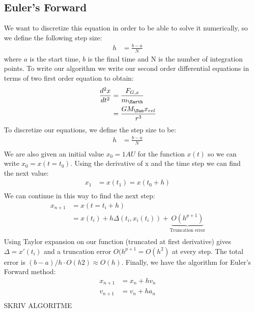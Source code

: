 \documentclass{article}
\begin{document}
\subsection*{Euler's Forward}
We want to discretize this equation in order to be able to solve it numerically, so we define the following step size:
\begin{align*}
  h &= \frac{b-a}{N}
\end{align*}
where $a$ is the start time, $b$ is the final time and N is the number of integration points.
To write our algorithm we write our second order differential equations in terms of two first order equation to obtain:
\begin{align*}
  \frac{d^2x}{dt^2} &= \frac{F_{G,x}}{m_{\Earth}}\\
  &= \frac{GM_{\Sun}x_{rel}}{r^3}\\
\end{align*}
To discretize our equations, we define the step size to be:
\begin{align*}
  h &= \frac{b-a}{N}\\
\end{align*}
We are also given an initial value $x_0 = 1AU$ for the function $x(t)$ so we can write $x_0 = x(t = t_0)$.
Using the derivative of x and the time step we can find the next value:
\begin{align*}
  x_1 &= x(t_1) = x(t_0+h)\\
\end{align*}
We can continue in this way to find the next step:
\begin{align*}
  x_{n+1} &= x(t=t_i+h)\\
  &=x(t_i)+h\Delta(t_i,x_i(t_i))+\underbrace{O(h^{p+1})}_{\text{Truncation error}}\\
\end{align*}
Using Taylor expansion on our function (truncated at first derivative) gives $\Delta= x'(t_i)$ and a truncation error $O(h^{p+1} = O(h^2)$ at every step. The total error is $(b-a)/h\cdot O(h2) \approx O(h)$.
Finally, we have the algorithm for Euler's Forward method:
\begin{align*}
  x_{n+1} &= x_n + hv_n\\
  v_{n+1} &= v_n + ha_n\\
\end{align*}
{\color[rgb]{1,0,0}SKRIV ALGORITME}
\end{document}
